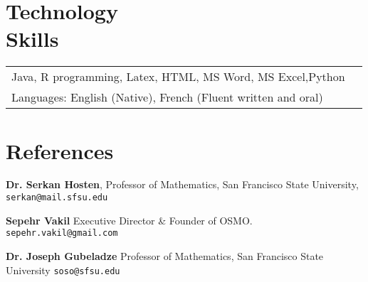 \documentclass[margin,line,pifont,palatino,courier]{res}
\begin{document}
\begin{resume}
\section{\sc Technology \\ Skills}

\begin{tabular}{@{}p{6in}p{3in}}

Java, R programming, Latex, HTML, MS Word, MS Excel,Python\\
Languages:  English (Native), French (Fluent written and oral)\\

\end{tabular}


\section{\sc References}
{\bf Dr. Serkan Hosten}, Professor of Mathematics, San Francisco State University,
\texttt{serkan@mail.sfsu.edu}

{\bf Sepehr Vakil} Executive Director \& Founder of OSMO.
  \texttt{sepehr.vakil@gmail.com} 
  
  {\bf Dr. Joseph Gubeladze}   Professor of Mathematics, San Francisco State University \texttt{soso@sfsu.edu}

\end{resume}
\end{document}
